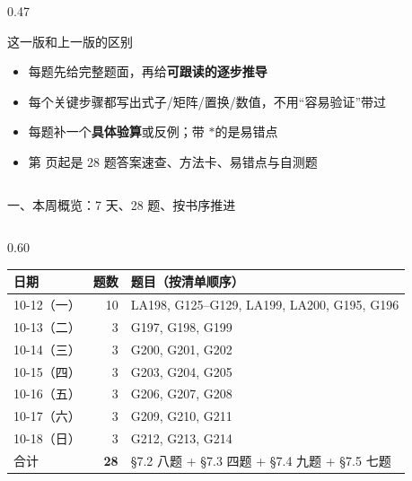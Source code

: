 \documentclass[aspectratio=169,10pt,fontset=none]{ctexbeamer}
\newcommand{\starpt}{\textcolor{accent}{\bfseries$\ast$}}
\begin{document}
\begin{frame}[plain]
\begin{columns}[T,onlytextwidth]
\begin{column}{0.47\textwidth}
\begin{block}{这一版和上一版的区别}
\begin{itemize}
          \item 每题先给完整题面，再给\textbf{可跟读的逐步推导}
          \item 每个关键步骤都写出式子/矩阵/置换/数值，不用“容易验证”带过
          \item 每题补一个\textbf{具体验算}或反例；带 \starpt 的是易错点
          \item 第 \pageref{sec:answers} 页起是 28 题答案速查、方法卡、易错点与自测题
        \end{itemize}
      \end{block}
    \end{column}
  \end{columns}
\end{frame}

\begin{frame}[t]{一、本周概览：7 天、28 题、按书序推进}
  \begin{columns}[T,onlytextwidth]
    \begin{column}{0.60\textwidth}
      \centering
      \scriptsize
      \setlength{\tabcolsep}{3pt}
      \renewcommand{\arraystretch}{1.10}
      \begin{tabular}{@{}l r l@{}}
        \toprule
        日期 & 题数 & 题目（按清单顺序）\\
        \midrule
        10-12（一） & 10 & LA198, G125--G129, LA199, LA200, G195, G196\\
        10-13（二） & 3  & G197, G198, G199\\
        10-14（三） & 3  & G200, G201, G202\\
        10-15（四） & 3  & G203, G204, G205\\
        10-16（五） & 3  & G206, G207, G208\\
        10-17（六） & 3  & G209, G210, G211\\
        \rowcolor{ink!8} 10-18（日） & 3 & G212, G213, G214\\
        \midrule
        合计 & \textbf{28} & \S7.2 八题 + \S7.3 四题 + \S7.4 九题 + \S7.5 七题\\
        \bottomrule
      \end{tabular}
      \vspace{0.3em}


\end{column}
\end{columns}
\end{frame}
\end{document}
